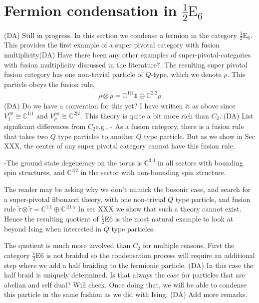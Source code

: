 \documentclass[12pt,a4paper]{article}
\newcommand{\tp}{\otimes}
\newcommand{\dave}[1]{{\color{ao(english)}\footnotesize{(DA) #1}}}
\newcommand{\halfesix}{\frac{1}{2}\text{E}_6}
\begin{document}
\section{Fermion condensation in $\halfesix$} \label{e6}
\dave{Still in progress.}
In this section we condense a fermion in the category $\halfesix$.
This provides the first example of a super pivotal category with fusion multiplicity\dave{Have there been any other examples of super-pivotal-categories with fusion multiplicity discussed in the literature?}.
The resulting super pivotal fusion category has one non-trivial particle of $Q$-type, which we denote $\rho$.
This particle obeys the fusion rule,
\begin{align}
\rho \tp \rho = \mathbb{C}^{1|1} \mathds{1} \oplus \mathbb{C}^{2|2} \rho
\end{align}
\dave{Do we have a convention for this yet? I have written it as above since $V^{\rho \rho}_\mathds{1}  \cong  \mathbb{C}^{1|1}$ and $ V^{\rho \rho}_\rho \cong \mathbb{C}^{2|2}$.}
This theory is quite a bit more rich than $C_2$. 
\dave{List significant differences from $C_2$}e.g.,
- As a fusion category, there is a fusion rule that takes two $Q$ type particles to another $Q$ type particle. 
But as we show in Sec XXX, the center of any super pivotal category cannot have this fusion rule.

-The ground state degeneracy on the torus is $\mathbb{C}^{3|0}$ in all sectors with bounding spin structures, and $\mathbb{C}^{1|2}$ in the sector with non-bounding spin structure.

The reader may be asking why we don't mimick the bosonic case, and search for a super-pivotal fibonacci theory, with one non-trivial $Q$ type particle, and fusion rule $\tilde{\tau} \tp \tilde{\tau} = \mathbb{C}^{1|1} \oplus \mathbb{C}^{1|1}$?
In sec XXX we show that such a theory cannot exist.
Hence the resulting quotient of $\frac{1}{2}$E6 is the most natural example to look at beyond Ising when interested in $Q$ type particles. 

The quotient is much more involved than $C_2$ for multiple reasons. 
First the category $\frac{1}{2}$E6 is not braided so the condensation process will require an additional step where we add a half braiding to the fermionic particle.
\dave{In this case the half braid is uniquely determined. Is that always the case for particles that are abelian and self dual? Will check.}
Once doing that, we will be able to condense this particle in the same fashion as we did with Ising.
\dave{Add more remarks.}
\end{document}
